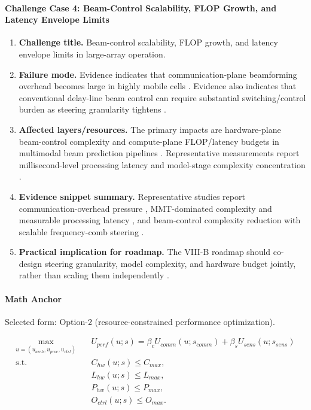\paragraph{Challenge Case 4: Beam-Control Scalability, FLOP Growth, and Latency Envelope Limits}
\begin{enumerate}
    \item \textbf{Challenge title.} Beam-control scalability, FLOP growth, and latency envelope limits in large-array operation.
    \item \textbf{Failure mode.} Evidence indicates that communication-plane beamforming overhead becomes large in highly mobile cells \cite{O_ISAC_134}. Evidence also indicates that conventional delay-line beam control can require substantial switching/control burden as steering granularity tightens \cite{O_ISAC_171}.
    \item \textbf{Affected layers/resources.} The primary impacts are hardware-plane beam-control complexity and compute-plane FLOP/latency budgets in multimodal beam prediction pipelines \cite{O_ISAC_134, O_ISAC_171}. Representative measurements report millisecond-level processing latency and model-stage complexity concentration \cite{O_ISAC_134}.
    \item \textbf{Evidence snippet summary.} Representative studies report communication-overhead pressure \cite{O_ISAC_134}, MMT-dominated complexity and measurable processing latency \cite{O_ISAC_134}, and beam-control complexity reduction with scalable frequency-comb steering \cite{O_ISAC_171}.
    \item \textbf{Practical implication for roadmap.} The VIII-B roadmap should co-design steering granularity, model complexity, and hardware budget jointly, rather than scaling them independently \cite{O_ISAC_134, O_ISAC_171}.
\end{enumerate}

\paragraph{Math Anchor}
Selected form: Option-2 (resource-constrained performance optimization).

\[
\begin{aligned}
\max_{u=(u_{arch},u_{proc},u_{ctrl})} \quad & U_{perf}(u;s)=\beta_c U_{comm}(u;s_{comm})+\beta_s U_{sens}(u;s_{sens}) \\
\text{s.t.} \quad & C_{hw}(u;s) \le C_{max}, \\
& L_{hw}(u;s) \le L_{max}, \\
& P_{hw}(u;s) \le P_{max}, \\
& O_{ctrl}(u;s) \le O_{max}.
\end{aligned}
\]


